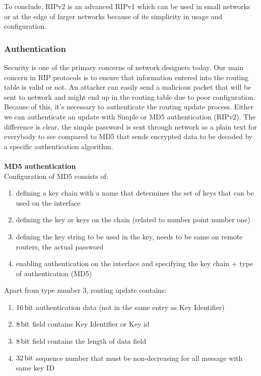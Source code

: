 \documentclass[11pt,a4paper]{article}
\begin{document}
\noindent
To conclude, RIPv2 is an advanced RIPv1 which can be used in small networks or at the edge of larger networks because of its simplicity in usage and configuration.

\subsubsection{Authentication}
\label{sec:auth}
Security is one of the primary concerns of network designers today\cite{auth}. Our main concern in RIP protocols is to ensure that information entered into the routing table is valid or not. An attacker can easily send a malicious packet that will be sent to network and might end up in the routing table due to poor configuration. Because of this, it's necessary to authenticate the routing update process. Either we can authenticate an update with Simple or MD5 authentication (RIPv2). The difference is clear, the simple password is sent through network as a plain text for everybody to see compared to MD5 that sends encrypted data to be decoded by a specific authentication algorithm.
\\ \\
\textbf{MD5 authentication}\\
\noindent
Configuration of MD5 consists of:

\begin{enumerate}
\item defining a key chain with a name that determines the set of keys that can be used on the interface
\item defining the key or keys on the chain (related to number point number one)
\item defining the key string to be used in the key, needs to be same on remote routers, the actual password
\item enabling authentication on the interface and specifying the key chain + type of authentication (MD5)
\end{enumerate}

\noindent
Apart from type number 3, routing update contains:
\begin{enumerate}
\item $\SI{16}{\bit}$ authentication data (not in the same entry as Key Identifier)
\item $\SI{8}{\bit}$ field contains Key Identifier or Key id
\item $\SI{8}{\bit}$ field contains the length of data field
\item $\SI{32}{\bit}$ sequence number that must be non-decreasing for all message with same key ID
\end{enumerate}
\end{document}
